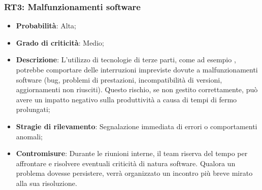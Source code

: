\subsubsection{RT3: Malfunzionamenti software}
\begin{itemize}
    \item \textbf{Probabilità}: Alta;
    \item \textbf{Grado di criticità}: Medio;
    \item \textbf{Descrizione}: L'utilizzo di tecnologie di terze parti, come ad esempio , potrebbe comportare delle interruzioni impreviste dovute a malfunzionamenti software (bug, problemi di prestazioni, incompatibilità di versioni, aggiornamenti non riusciti). Questo rischio, se non gestito correttamente, può avere un impatto negativo sulla produttività a causa di tempi di fermo prolungati;
    \item \textbf{Stragie di rilevamento}: Segnalazione immediata di errori o comportamenti anomali;
    \item \textbf{Contromisure}: Durante le riunioni interne, il team riserva del tempo per affrontare e risolvere eventuali criticità di natura software. Qualora un problema dovesse persistere, verrà organizzato un incontro più breve mirato alla sua risoluzione.
\end{itemize}